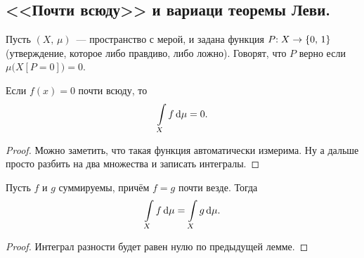 \documentclass{notes}
\begin{document}
\subsection{<<Почти всюду>> и вариаци теоремы Леви.}
	
	\begin{de}
		Пусть $(X, \, \mu)$~--- пространство с мерой, и задана функция $P\text{\text{:}} \; X \to \{0, \, 1\}$ (утверждение, которое либо правдиво, либо ложно). Говорят, что $P$ верно  если $\mu\big(X[P = 0]\big) = 0$. 
	\end{de}

	\begin{lm}
		Если $f(x) = 0$ почти всюду, то
		\[
			\int\limits_X f \, \mathrm{d} \mu = 0.
		\]
		\begin{proof}
			Можно заметить, что такая функция автоматически измерима. Ну а дальше просто разбить на два множества и записать интегралы.
		\end{proof}
	\end{lm}

	\begin{lm}
		Пусть $f$ и $g$ суммируемы, причём $f = g$ почти везде. Тогда
		\[
			\int\limits_{X} f \, \mathrm{d} \mu = \int\limits_{X} g \, \mathrm{d} \mu.
		\]
		\begin{proof}
			Интеграл разности будет равен нулю по предыдущей лемме.
		\end{proof}
	\end{lm}
\end{document}
